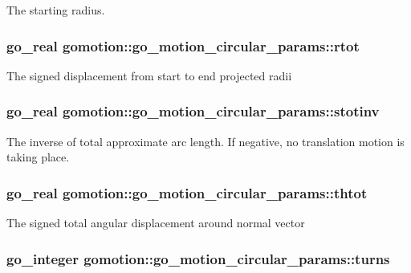 The starting radius. \hypertarget{structgomotion_1_1go__motion__circular__params_a576992f878d73c0771e072fe37438f4f}{
\subsubsection[{rtot}]{\setlength{\rightskip}{0pt plus 5cm}go\-\_\-real gomotion\-::go\-\_\-motion\-\_\-circular\-\_\-params\-::rtot}}\label{structgomotion_1_1go__motion__circular__params_a576992f878d73c0771e072fe37438f4f}
The signed displacement from start to end projected radii \hypertarget{structgomotion_1_1go__motion__circular__params_a4436b498d123ce3776166eb75e8efcd5}{
\subsubsection[{stotinv}]{\setlength{\rightskip}{0pt plus 5cm}go\-\_\-real gomotion\-::go\-\_\-motion\-\_\-circular\-\_\-params\-::stotinv}}\label{structgomotion_1_1go__motion__circular__params_a4436b498d123ce3776166eb75e8efcd5}
The inverse of total approximate arc length. If negative, no translation motion is taking place. \hypertarget{structgomotion_1_1go__motion__circular__params_a03f65f0ef19c2d9e83d05de75fe9fd3f}{
\subsubsection[{thtot}]{\setlength{\rightskip}{0pt plus 5cm}go\-\_\-real gomotion\-::go\-\_\-motion\-\_\-circular\-\_\-params\-::thtot}}\label{structgomotion_1_1go__motion__circular__params_a03f65f0ef19c2d9e83d05de75fe9fd3f}
The signed total angular displacement around normal vector \hypertarget{structgomotion_1_1go__motion__circular__params_a2d8430003302e61cb95c2a0c75e60037}{
\subsubsection[{turns}]{\setlength{\rightskip}{0pt plus 5cm}go\-\_\-integer gomotion\-::go\-\_\-motion\-\_\-circular\-\_\-params\-::turns}}\label{structgomotion_1_1go__motion__circular__params_a2d8430003302e61cb95c2a0c75e60037}
